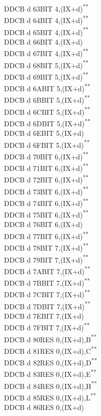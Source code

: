 \documentclass[twoside,openright,a4paper]{book}
\newcommand{\UNDOC}{\textnormal{\textsuperscript{**}}}
\begin{document}
\begin{multicols}{3}
{\begin{tabbing}
	DDCB d 63\>BIT 4,(IX+d)\UNDOC\\
	DDCB d 64\>BIT 4,(IX+d)\UNDOC\\
	DDCB d 65\>BIT 4,(IX+d)\UNDOC\\
	DDCB d 66\>BIT 4,(IX+d)\\
	DDCB d 67\>BIT 4,(IX+d)\UNDOC\\
	DDCB d 68\>BIT 5,(IX+d)\UNDOC\\
	DDCB d 69\>BIT 5,(IX+d)\UNDOC\\
	DDCB d 6A\>BIT 5,(IX+d)\UNDOC\\
	DDCB d 6B\>BIT 5,(IX+d)\UNDOC\\
	DDCB d 6C\>BIT 5,(IX+d)\UNDOC\\
	DDCB d 6D\>BIT 5,(IX+d)\UNDOC\\
	DDCB d 6E\>BIT 5,(IX+d)\\
	DDCB d 6F\>BIT 5,(IX+d)\UNDOC\\
	DDCB d 70\>BIT 6,(IX+d)\UNDOC\\
	DDCB d 71\>BIT 6,(IX+d)\UNDOC\\
	DDCB d 72\>BIT 6,(IX+d)\UNDOC\\
	DDCB d 73\>BIT 6,(IX+d)\UNDOC\\
	DDCB d 74\>BIT 6,(IX+d)\UNDOC\\
	DDCB d 75\>BIT 6,(IX+d)\UNDOC\\
	DDCB d 76\>BIT 6,(IX+d)\\
	DDCB d 77\>BIT 6,(IX+d)\UNDOC\\
	DDCB d 78\>BIT 7,(IX+d)\UNDOC\\
	DDCB d 79\>BIT 7,(IX+d)\UNDOC\\
	DDCB d 7A\>BIT 7,(IX+d)\UNDOC\\
	DDCB d 7B\>BIT 7,(IX+d)\UNDOC\\
	DDCB d 7C\>BIT 7,(IX+d)\UNDOC\\
	DDCB d 7D\>BIT 7,(IX+d)\UNDOC\\
	DDCB d 7E\>BIT 7,(IX+d)\\
	DDCB d 7F\>BIT 7,(IX+d)\UNDOC\\
	DDCB d 80\>RES 0,(IX+d),B\UNDOC\\
	DDCB d 81\>RES 0,(IX+d),C\UNDOC\\
	DDCB d 82\>RES 0,(IX+d),D\UNDOC\\
	DDCB d 83\>RES 0,(IX+d),E\UNDOC\\
	DDCB d 84\>RES 0,(IX+d),H\UNDOC\\
	DDCB d 85\>RES 0,(IX+d),L\UNDOC\\
	DDCB d 86\>RES 0,(IX+d)\\

\end{tabbing}}
\end{multicols}
\end{document}
